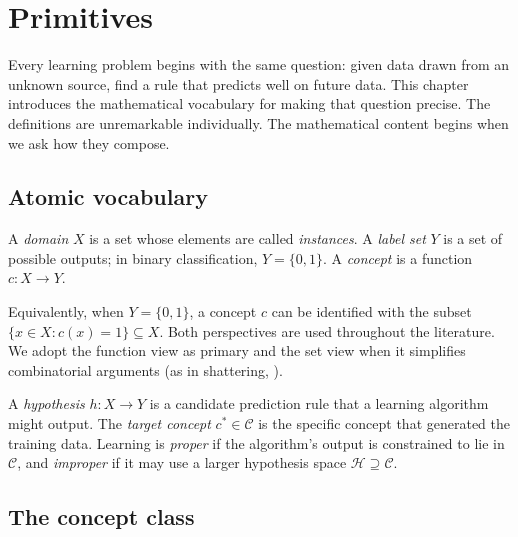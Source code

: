 
\chapter{Primitives}\label{chap:primitives}

Every learning problem begins with the same question: given data drawn
from an unknown source, find a rule that predicts well on future data.
This chapter introduces the mathematical vocabulary for making that
question precise. The definitions are unremarkable individually.  The
mathematical content begins when we ask how they compose.

\section{Atomic vocabulary}\label{sec:atoms}

\begin{defn}
\label{def:domain-label-concept}
  \leanok
A \emph{domain} $X$ is a set whose elements are called \emph{instances}.
A \emph{label set} $Y$ is a set of possible outputs; in binary
classification, $Y = \{0, 1\}$. A \emph{concept} is a function
$c : X \to Y$.

Equivalently, when $Y = \{0,1\}$, a concept $c$ can be identified with
the subset $\{x \in X : c(x) = 1\} \subseteq X$. Both perspectives are
used throughout the literature. We adopt the function view as primary
and the set view when it simplifies combinatorial arguments (as in
shattering, ).
\end{defn}

\begin{defn}
\label{def:hypothesis-target}
A \emph{hypothesis} $h : X \to Y$ is a candidate prediction rule that a
learning algorithm might output. The \emph{target concept}
$c^* \in \mathcal{C}$ is the specific concept that generated the
training data. Learning is \emph{proper} if the algorithm's output is
constrained to lie in $\mathcal{C}$, and \emph{improper} if it may use
a larger hypothesis space $\mathcal{H} \supseteq \mathcal{C}$.
\end{defn}

\section{The concept class}\label{sec:concept-class}

